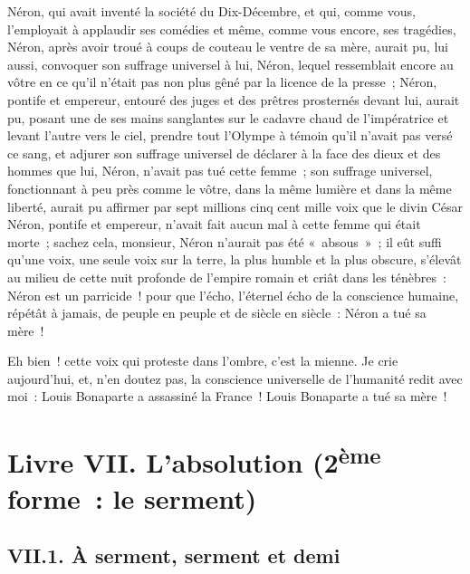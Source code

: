\documentclass[french,twoside]{book} %
\newcommand\chapteropen{} %
\newcommand\chaptercont{} %
\newcommand\chapterclose{} %
\begin{document}
Néron, qui avait inventé la société du Dix-Décembre, et qui, comme vous, l’employait à applaudir ses comédies et même, comme vous encore, ses tragédies, Néron, après avoir troué à coups de couteau le ventre de sa mère, aurait pu, lui aussi, convoquer son suffrage universel à lui, Néron, lequel ressemblait encore au vôtre en ce qu’il n’était pas non plus gêné par la licence de la presse ; Néron, pontife et empereur, entouré des juges et des prêtres prosternés devant lui, aurait pu, posant une de ses mains sanglantes sur le cadavre chaud de l’impératrice et levant l’autre vers le ciel, prendre tout l’Olympe à témoin qu’il n’avait pas versé ce sang, et adjurer son suffrage universel de déclarer à la face des dieux et des hommes que lui, Néron, n’avait pas tué cette femme ; son suffrage universel, fonctionnant à peu près comme le vôtre, dans la même lumière et dans la même liberté, aurait pu affirmer par sept millions cinq cent mille voix que le divin César Néron, pontife et empereur, n’avait fait aucun mal à cette femme qui était morte ; sachez cela, monsieur, Néron n’aurait pas été « absous » ; il eût suffi qu’une voix, une seule voix sur la terre, la plus humble et la plus obscure, s’élevât au milieu de cette nuit profonde de l’empire romain et criât dans les ténèbres : Néron est un parricide ! pour que l’écho, l’éternel écho de la conscience humaine, répétât à jamais, de peuple en peuple et de siècle en siècle : Néron a tué sa mère !\par
Eh bien ! cette voix qui proteste dans l’ombre, c’est la mienne. Je crie aujourd’hui, et, n’en doutez pas, la conscience universelle de l’humanité redit avec moi : Louis Bonaparte a assassiné la France ! Louis Bonaparte a tué sa mère !
\chapterclose


\chapteropen

\chapter[{Livre VII. L’absolution (2ème forme : le serment)}]{Livre VII. L’absolution (2\textsuperscript{ème} forme : le serment)}
\renewcommand{\leftmark}{Livre VII. L’absolution (2\textsuperscript{ème} forme : le serment)}


\chaptercont

\section[{VII.1. À serment, serment et demi}]{VII.1. À serment, serment et demi}
\end{document}
